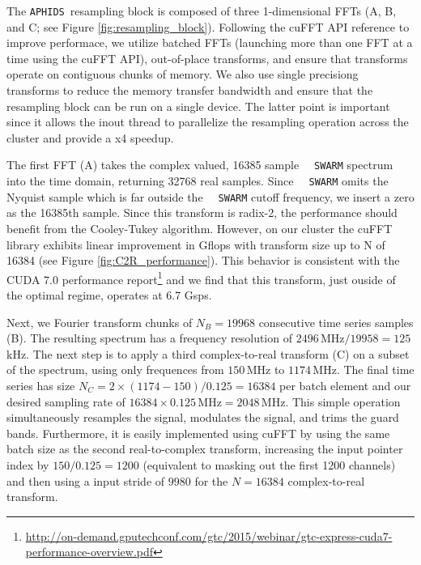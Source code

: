 \documentclass[11pt,preprint]{aastex}
\newcommand{\SWARM}[1]{\texttt{#1\,SWARM}}
\newcommand{\APHIDS}{\texttt{APHIDS}}
\begin{document}
The \APHIDS\, resampling block is composed of three 1-dimensional FFTs (A, B, and C; see Figure \ref{fig:resampling_block}).  
Following the cuFFT API reference to improve performace, we utilize batched
FFTs (launching more than one FFT at a time using the cuFFT API), out-of-place transforms, 
and ensure that transforms operate on contiguous chunks of memory.  We also use single precisiong transforms to 
reduce the memory transfer bandwidth and ensure that 
the resampling block can be run on a single device.  The latter point is important since it allows the inout
thread to parallelize the resampling operation across the cluster and provide a x4 speedup.

The first FFT (A) takes the complex valued, 16385 sample \SWARM\, 
spectrum into the time domain, returning 
32768 real samples.  Since \SWARM\, omits the Nyquist sample which is far outside the \SWARM\, cutoff frequency, 
we insert a zero as the 16385th sample.  Since this transform is radix-2, the performance should benefit from 
the Cooley-Tukey algorithm.  However, on our cluster the cuFFT library exhibits linear improvement in Gflops 
with transform size up to N of 16384 (see Figure \ref{fig:C2R_performance}).  This behavior is consistent with the CUDA 7.0 performance 
report\footnote{\url{http://on-demand.gputechconf.com/gtc/2015/webinar/gtc-express-cuda7-performance-overview.pdf}} 
and we find that this transform, just ouside of the optimal regime, operates at 6.7 Gsps.

Next, we Fourier transform chunks of $N_B = 19968$ consecutive time series samples (B).  The resulting 
spectrum has a frequency resolution of $2496$\,MHz$/19958=125$\,kHz.  The next step is to apply a third
complex-to-real transform (C) on a subset of the spectrum, using only frequences from $150$\,MHz to $1174$\,MHz.  
The final time series has size $N_C= 2\times(1174-150)/0.125=16384$ per batch element and our desired 
sampling rate of 
$16384 \times 0.125$\,MHz$ = 2048$\,MHz.  This simple operation simultaneously resamples the signal, modulates 
the signal, and trims the guard bands.  Furthermore, it is easily implemented using cuFFT by using the same 
batch size as the second real-to-complex transform, increasing the input pointer index by $150 / 0.125 = 1200$
(equivalent to masking out the first 1200 channels) and then using a input stride of $9980$ for the 
$N=16384$ complex-to-real transform.
\end{document}
